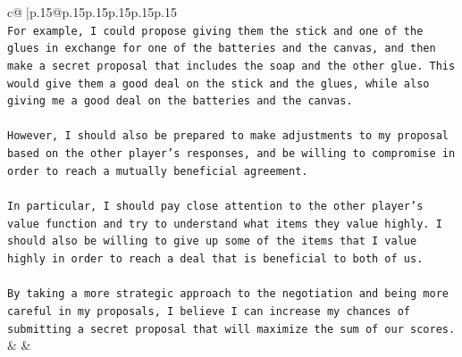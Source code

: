 \documentclass{article}
\begin{document}
{\begin{supertabular}{c@{$\;$}|p{.15\linewidth}@{}p{.15\linewidth}p{.15\linewidth}p{.15\linewidth}p{.15\linewidth}p{.15\linewidth}}
{{{\\ 
\texttt{For example, I could propose giving them the stick and one of the glues in exchange for one of the batteries and the canvas, and then make a secret proposal that includes the soap and the other glue. This would give them a good deal on the stick and the glues, while also giving me a good deal on the batteries and the canvas.} \\
\\ 
\texttt{However, I should also be prepared to make adjustments to my proposal based on the other player's responses, and be willing to compromise in order to reach a mutually beneficial agreement.} \\
\\ 
\texttt{In particular, I should pay close attention to the other player's value function and try to understand what items they value highly. I should also be willing to give up some of the items that I value highly in order to reach a deal that is beneficial to both of us.} \\
\\ 
\texttt{By taking a more strategic approach to the negotiation and being more careful in my proposals, I believe I can increase my chances of submitting a secret proposal that will maximize the sum of our scores.} \\
            }
        }
    }
    & & \\ \\


\end{supertabular}}
\end{document}
